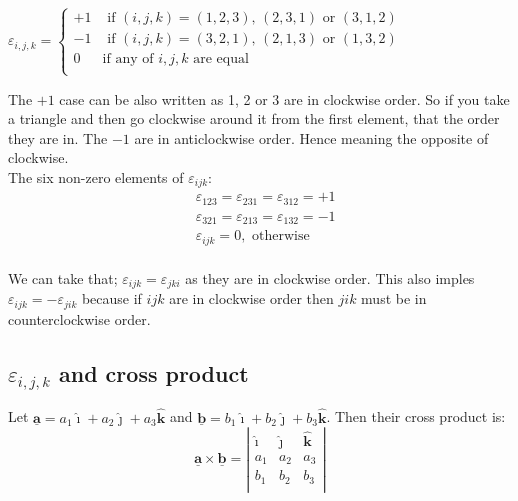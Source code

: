\documentclass{article}
\renewcommand{\vec}[1]{\underline{\textbf{#1}}}
\newcommand{\veci}{\bm{\hat{\imath}}}
\newcommand{\vecj}{\bm{\hat{\jmath}}}
\newcommand{\veck}{\bm{\hat{k}}}
\newcommand{\e}{\varepsilon}
\newcommand{\at}{\e_{i, j, k}}
\begin{document}
$\at = \begin{cases}
  +1 & \text{ if } (i, j, k) = (1, 2, 3),\, (2, 3, 1) \text{ or } (3, 1, 2)\\
  -1 & \text{ if } (i, j, k) = (3, 2, 1),\, (2, 1, 3) \text{ or } (1, 3, 2)\\
  0 & \text{if any of } i, j, k \text{ are equal} \\
\end{cases}$
\begin{figure}[H]
  \centering
{}
\end{figure}
The $+1$ case can be also written as 1, 2 or 3 are in clockwise order. So if you take a triangle and then go clockwise around it from the first element, that the order they are in. The $-1$ are in anticlockwise order. Hence meaning the opposite of clockwise.\\

The six non-zero elements of $\e_{ijk}$:
\begin{align*}
  &\e_{123} = \e_{231} = \e_{312} = +1\\
  &\e_{321} = \e_{213} = \e_{132} = -1 \\
  &\e_{ijk} = 0, \text{ otherwise} \\
\end{align*}

We can take that; $\e_{ijk} = \e_{jki} $ as they are in clockwise order. This also imples $\e_{ijk} = - \e_{jik}$ because if $ijk $ are in clockwise order then $jik$ must be in counterclockwise order.

\subsection{$\e_{i, j, k}$ and cross product}

Let $\vec a = {a}_1 \veci + {a}_2 \vecj + {a}_3 \veck$ and $\vec b = {b}_1 \veci + {b}_2 \vecj + {b}_3 \veck$. Then their cross product is:
$$ \vec a \times \vec b = \left|\begin{matrix}
  \veci & \vecj & \veck \\
  a_1 & a_2 & a_3 \\
  b_1 & b_2 & b_3 \\
\end{matrix}\right| $$
\end{document}
